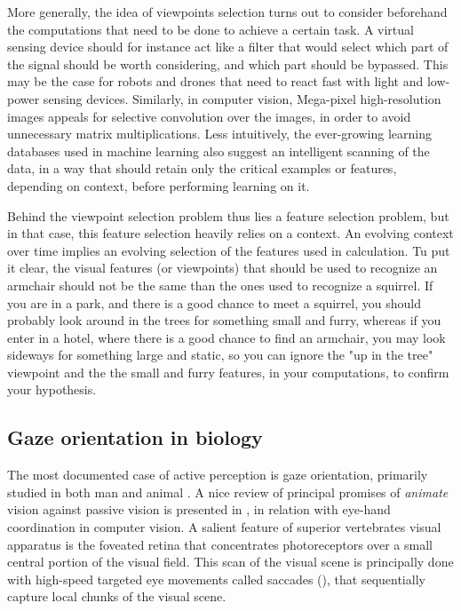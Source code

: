 \documentclass{article} %
\begin{document}
	More generally, the idea of viewpoints selection turns out to consider beforehand the computations that need to be done to achieve a certain task. A virtual sensing device should for instance act like a filter that would select which part of the signal should be worth considering, and which part should be bypassed.  
	This may be the case for robots and drones  that need to react fast with light and low-power sensing devices. Similarly, in computer vision, Mega-pixel high-resolution images appeals for selective convolution over the images, in order to avoid unnecessary matrix multiplications. Less intuitively, the ever-growing  learning databases used in machine learning also suggest an intelligent scanning of the data, in a way that should retain only the critical examples or features, depending on context, before performing learning on it.  
	
	Behind the viewpoint selection problem thus lies a feature selection problem, but in that case, this feature selection heavily relies on a context. An evolving context over time implies an evolving selection of the features used in calculation. Tu put it clear, the visual features (or viewpoints) that should be used to recognize an armchair should not  be the same than the ones used to recognize a squirrel. If you are in a park, and there is a good chance to meet a squirrel, you should probably look around in the trees for something small and furry, whereas if you enter in a hotel, where there is a good chance to find an armchair, you may look sideways for something large and static, so you can ignore the "up in the tree" viewpoint and the the small and furry features, in your computations, to confirm your hypothesis.
	
	
	
	\subsection{Gaze orientation in biology}
	
	The most documented case of active perception is gaze orientation, primarily studied in both man and animal \cite{yarbus1967eye,robinson1968eye}. A nice review of principal promises of \emph{animate} vision against passive vision  is presented in \cite{ballard1991animate},  in relation with eye-hand coordination in computer vision.
	A salient feature of superior vertebrates visual apparatus is the foveated retina that concentrates  photoreceptors over a small central portion of the visual field.
	 This scan of the visual scene is principally done with high-speed targeted eye movements called saccades (\cite{yarbus1967eye}), that sequentially capture local chunks of the visual scene. 
	
\end{document}
